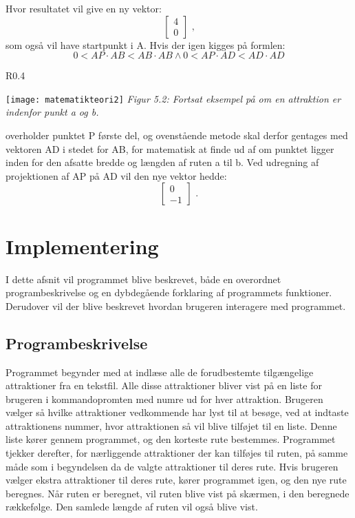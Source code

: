 Hvor resultatet vil give en ny vektor: \[ \begin{bmatrix} 4 \\ 0 \end{bmatrix} \text{ ,} \]  som også vil have startpunkt i A. Hvis der igen kigges på formlen:
\[0 < AP \cdot AB < AB \cdot AB \wedge 0 < AP \cdot AD < AD \cdot AD \]
\begin{wrapfigure}{R}{0.4\textwidth}
  \vspace{-20pt}
  \begin{center}
    \texttt{[image: matematikteori2]} \newline
    \textit{Figur 5.2: Fortsat eksempel på om en attraktion er indenfor punkt a og b.}\newline
  \end{center}
  \vspace{-20pt}
\end{wrapfigure}

overholder punktet P første del, og ovenstående metode skal derfor gentages med vektoren AD i stedet for AB, for matematisk at finde ud af om punktet ligger inden 	for den afsatte bredde og længden af ruten a til b. Ved udregning af projektionen af AP på AD vil den nye vektor hedde: \[ \begin{bmatrix} 0 \\ -1 \end{bmatrix} \text{ .} \]\newline
\newline



\section{Implementering}

I dette afsnit vil programmet blive beskrevet, både en overordnet programbeskrivelse og en dybdegående forklaring af programmets funktioner. Derudover vil der blive beskrevet hvordan brugeren interagere med programmet. 

\subsection{Programbeskrivelse}
Programmet begynder med at indlæse alle de forudbestemte tilgængelige attraktioner fra en tekstfil. Alle disse attraktioner bliver vist på en liste for brugeren i kommandopromten med numre ud for hver attraktion. Brugeren vælger så hvilke attraktioner vedkommende har lyst til at besøge, ved at indtaste attraktionens nummer, hvor attraktionen så vil blive tilføjet til en liste. Denne liste kører gennem programmet, og den korteste rute bestemmes. Programmet tjekker derefter, for nærliggende attraktioner der kan tilføjes til ruten, på samme måde som i begyndelsen da de valgte attraktioner til deres rute. Hvis brugeren vælger ekstra attraktioner til deres rute, kører programmet igen, og den nye rute beregnes.  Når ruten er beregnet, vil ruten blive vist på skærmen, i den beregnede rækkefølge. Den samlede længde af ruten vil også blive vist.

